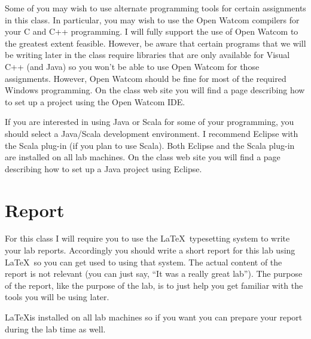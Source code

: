 \documentclass[twocolumn]{article}
\begin{document}
Some of you may wish to use alternate programming tools for certain assignments in this class.
In particular, you may wish to use the Open Watcom compilers for your C and C++ programming. I
will fully support the use of Open Watcom to the greatest extent feasible. However, be aware
that certain programs that we will be writing later in the class require libraries that are only
available for Visual C++ (and Java) so you won't be able to use Open Watcom for those
assignments. However, Open Watcom should be fine for most of the required Windows programming.
On the class web site you will find a page describing how to set up a project using the Open
Watcom IDE.

If you are interested in using Java or Scala for some of your programming, you should select a
Java/Scala development environment. I recommend Eclipse with the Scala plug-in (if you plan to
use Scala). Both Eclipse and the Scala plug-in are installed on all lab machines. On the class
web site you will find a page describing how to set up a Java project using Eclipse.

\section{Report}

For this class I will require you to use the \LaTeX\ typesetting system to write your lab
reports. Accordingly you should write a short report for this lab using \LaTeX\ so you can get
used to using that system. The actual content of the report is not relevant (you can just say,
``It was a really great lab''). The purpose of the report, like the purpose of the lab, is to
just help you get familiar with the tools you will be using later.

\LaTeX is installed on all lab machines so if you want you can prepare your report during the
lab time as well.
\end{document}
